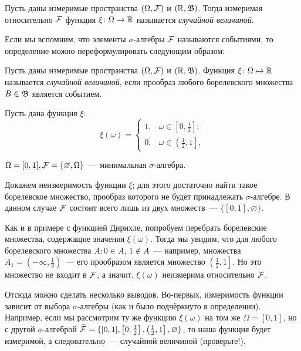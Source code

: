 \begin{defn}
    Пусть даны измеримые пространства $(\Omega, \mathcal{F})$ и $(\mathbb{R}, \mathfrak{B})$. 
    Тогда измеримая относительно $\mathcal{F}$ функция $\xi \colon \Omega \to \mathbb{R}$ называется \textit{случайной величиной}.
\end{defn}
\begin{rmrk}
    Если мы вспомним, что элементы $\sigma$-алгебры $\mathcal{F}$ называются событиями, то определение можно переформулировать следующим образом: 
    
    Пусть даны измеримые пространства $(\Omega, \mathcal{F})$ и $(\mathbb{R}, \mathfrak{B})$. 
    Функция $\xi \colon \Omega \mapsto \mathbb{R}$ называется \textit{случайной величиной}, если прообраз любого борелевского множества $B \in \mathfrak{B}$ является событием.
\end{rmrk}
\begin{exmp} Пусть дана функция $\xi$:
\begin{equation*}
    \xi(\omega) = 
    \begin{cases}
        1, & \omega \in \left[0, \frac{1}{2}\right]; \\
        0, & \omega \in \left(\frac{1}{2}, 1\right],
    \end{cases}
\end{equation*}

$\Omega = [0, 1], \mathcal{F} = \{\varnothing, \Omega\}$~--- минимальная ${\sigma \text{-алгебра}}$.  

Докажем неизмеримость функции $\xi$; для этого достаточно найти такое борелевское множество, прообраз которого не будет принадлежать ${\sigma \text{-алгебре}}$. 
В данном случае $\mathcal{F}$ состоит всего лишь из двух множеств~--- $\{[0, 1], \varnothing\}$.

Как и в примере с функцией Дирихле, попробуем перебрать борелевские множества, содержащие значения $\xi(\omega)$. 
Тогда мы увидим, что для любого борелевского множества $A \colon 0 \in A, \, 1 \notin A$~--- например, множества ${A_1 = \left(-\infty, \frac{1}{3}\right)}$~--- его прообразом является множество $\left(\frac{1}{2}, 1\right]$. 
Но это множество не входит в $\mathcal{F}$, а значит, $\xi(\omega)$ неизмерима относительно $\mathcal{F}$.

Отсюда можно сделать несколько выводов. Во-первых, измеримость функции зависит от выбора ${\sigma \text{-алгебры}}$ (как и было подчёркнуто в определении). 
Например, если мы рассмотрим ту же функцию $\xi(\omega)$ на том же $\Omega = [0, 1]$, 
но с другой $\sigma$-алгеброй ${\widehat{\mathcal{F}} = \{[0, 1], \left[0; \frac{1}{2}\right], \left(\frac{1}{2}, 1\right], \varnothing\}}$, то наша функция будет измеримой, а следовательно~--- случайной величиной (проверьте!).


\end{exmp}
